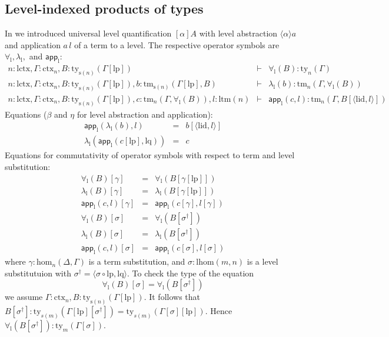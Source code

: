 \documentclass[submission,copyright,creativecommons]{eptcs}
\newcommand{\app}[2]{{#1\,#2}} %
\def\lhom{\mathrm{lhom}}
\def\sub{\mathrm{hom}}
\def\lctx{\mathrm{lctx}}
\def\ltm{\mathrm{ltm}}
\def\lp{\mathrm{lp}}
\def\lq{\mathrm{lq}}
\def\s{\mathrm{s}}
\def\lid{\mathrm{lid}}
\newcommand{\ctx}{\mathrm{ctx}}
\newcommand{\ty}{\mathrm{ty}}
\newcommand{\tm}{\mathrm{tm}}
\newcommand{\tuple}[1]{\langle #1 \rangle}
\def\app{\mathsf{app}}
\begin{document}
\subsection{Level-indexed products of types}
\def\l{\mathrm{l}}
In \cite[Section 4]{BezemCDE22} we introduced
universal level quantification $[\alpha]A$ with level abstraction $\tuple{\alpha}a$ and application $a\,l$ of a term to a level. The respective operator symbols are $\forall_\l, \lambda_\l,$ and $\app_\l$:
\begin{eqnarray*}
n : \lctx, \Gamma : \ctx_n, B : \ty_{\s(n)}(\Gamma[\lp])&\vdash& \forall_\l(B) : \ty_n(\Gamma)\\
n : \lctx, \Gamma : \ctx_n, B : \ty_{\s(n)}(\Gamma[\lp]), b : \tm_{\s(n)}(\Gamma[\lp], B) &\vdash& \lambda_\l(b) : \tm_n(\Gamma,\forall_\l(B))\\
n : \lctx, \Gamma : \ctx_n, B : \ty_{\s(n)}(\Gamma[\lp]), c :  \tm_n(\Gamma,\forall_\l(B)), l : \ltm(n) &\vdash& \app_\l(c,l) : \tm_n(\Gamma, B[\tuple{\lid,l}])
\end{eqnarray*}
Equations ($\beta$ and $\eta$ for level abstraction and application):
 \begin{eqnarray*}
 \app_\l(\lambda_\l(b),l) &=& b[\tuple{\lid,l}]\\
 \lambda_\l(\app_\l(c[\lp],\lq)) &=& c
 \end{eqnarray*}
 Equations for commutativity of operator symbols with respect to term and level substitution:
 \begin{eqnarray*}
 \forall_\l(B)[ \gamma ] &=& \forall_\l(B[ \gamma[\lp]])\\
 \lambda_\l(B)[ \gamma ] &=& \lambda_\l(B[ \gamma[\lp]])\\
 \app_\l(c,l)[ \gamma ] &=& \app_\l(c[ \gamma ] ,l[ \gamma ] )\\
 \forall_\l(B)[ \sigma ] &=& \forall_\l(B[ \sigma^{\dagger}])\\
 \lambda_\l(B)[ \sigma ] &=& \lambda_\l(B[ \sigma^{\dagger}])\\
\app_\l(c,l)[ \sigma ] &=& \app_\l(c[ \sigma ] ,l[ \sigma ] )
\end{eqnarray*}
where $\gamma : \sub_n(\Delta,\Gamma)$ is a term substitution, and $\sigma : \lhom(m,n)$ is a level substitutuion with $\sigma^\dagger = \tuple{\sigma \circ \lp, \lq}$.
To check the type of the equation
$$ \forall_\l(B)[ \sigma ] = \forall_\l(B[ \sigma^{\dagger}])$$ we assume $\Gamma : \ctx_n, B : \ty_{\s(n)}(\Gamma[\lp])$. It follows that $B[\sigma^\dagger] : \ty_{s(m)}(\Gamma[\lp][\sigma^\dagger]) = \ty_{s(m)}(\Gamma[\sigma][\lp])$. Hence
$\forall_\l(B[ \sigma^{\dagger}]) : \ty_m(\Gamma[\sigma])$.
\end{document}
